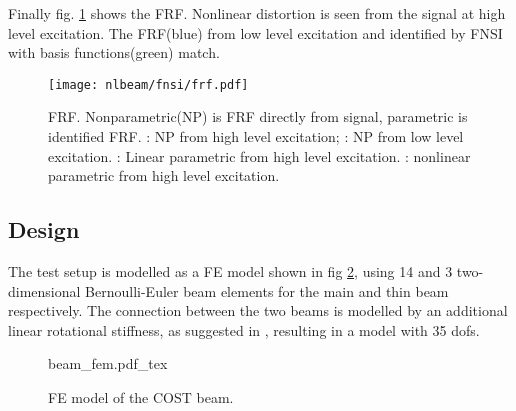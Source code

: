 Finally fig. \ref{fig:nlbeam_frf} shows the FRF. Nonlinear distortion is seen
from the signal at high level excitation. The FRF(blue) from low level excitation and
identified by FNSI with basis functions(green) match.

\begin{figure}[!ht]
  \centering
  \texttt{[image: nlbeam/fnsi/frf.pdf]}
  \caption{FRF. Nonparametric(NP) is FRF directly from signal, parametric is
    identified FRF.
    \sampleline{}: NP from high level excitation;
    \textcolor{blue}{\sampleline{}}: NP from low level excitation.
    \textcolor{orange}{\sampleline{}}: Linear parametric from high level excitation.
    \textcolor{green}{}: nonlinear parametric from high level excitation.
}
  \label{fig:nlbeam_frf}
\end{figure}

\subsection{Design}

The test setup is modelled as a FE model shown in fig \ref{fig:nlbeam_fem},
using 14 and 3 two-dimensional Bernoulli-Euler beam elements for the main and
thin beam respectively. The connection between the two beams is modelled by an
additional linear rotational stiffness, as suggested in
\autocite{lenaerts2003a}, resulting in a model with 35 dofs.

\begin{figure}[!ht]
  \centering
  \def\svgwidth{10cm}
  {beam_fem.pdf_tex}
  \caption{FE model of the COST beam.}
  \label{fig:nlbeam_fem}
\end{figure}

